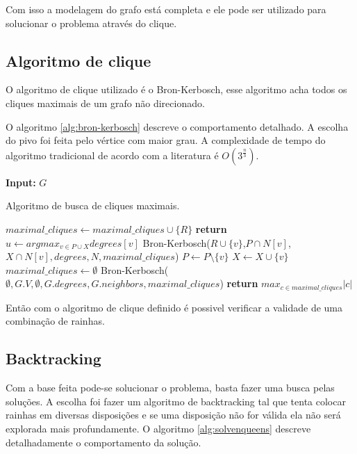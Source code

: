 \documentclass[11pt]{article}
\begin{document}
Com isso a modelagem do grafo está completa e ele pode ser utilizado para solucionar o problema através do clique.



\subsection{Algoritmo de clique}
\label{sec:org92b554c}

O algoritmo de clique utilizado é o Bron-Kerbosch, esse algoritmo acha todos os cliques maximais de um grafo não direcionado. \cite{bron73_algor}

O algoritmo \ref{alg:bron-kerbosch} descreve o comportamento detalhado. A escolha do pivo foi feita pelo vértice com maior grau. A complexidade de tempo do algoritmo tradicional de acordo com a literatura é \(O(3^{\frac{n}{3}})\).

\begin{algorithm}
\textbf{Input:} $G$
\caption{Algoritmo de busca de cliques maximais.}\label{alg:bron-kerbosch}
\begin{algorithmic}[1]
\State $maximal\_cliques \gets maximal\_cliques \cup \{R\}$
\State \textbf{return}
\EndIf
\State $u \gets argmax_{v\in P \cup X} degrees[v]$
\State Bron-Kerbosch($R \cup \{v\}$,$P \cap N[v]$,$X \cap N[v],degrees,N,maximal\_cliques$)
\State $P \gets P \setminus \{v\}$
\State $X \gets X \cup \{v\}$
\EndFor
\EndProcedure
{}
\State $maximal\_cliques \gets \emptyset$
\State Bron-Kerbosch($\emptyset,G.V,\emptyset,G.degrees,G.neighbors,maximal\_cliques$)
\State \textbf{return} $max_{c \in maximal\_cliques} |c|$
\EndProcedure
\end{algorithmic}
\end{algorithm}


Então com o algoritmo de clique definido é possivel verificar a validade de uma combinação de rainhas.

\subsection{Backtracking}
\label{sec:org6779e96}

Com a base feita pode-se solucionar o problema, basta fazer uma busca pelas soluções. A escolha foi fazer um algoritmo de backtracking tal que tenta colocar rainhas em diversas disposições e se uma disposição não for válida ela não será explorada mais profundamente. O algoritmo \ref{alg:solvenqueens} descreve detalhadamente o comportamento da solução.
\end{document}
